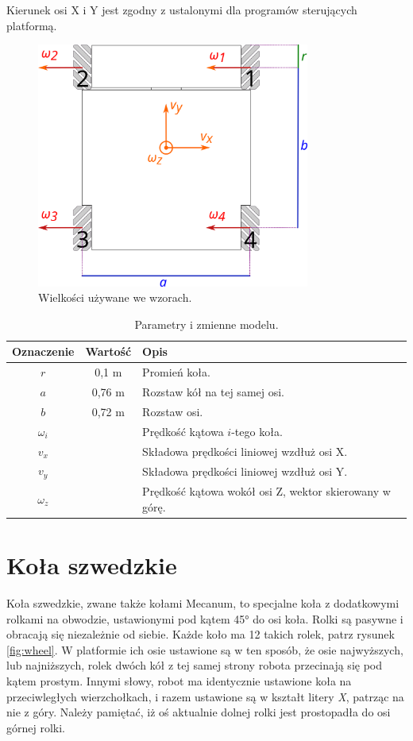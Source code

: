 	Kierunek osi X i Y jest zgodny z ustalonymi dla programów sterujących platformą.
	
	\begin{figure}[H]
		\centering
		\includegraphics[width=0.8\textwidth]{graphics/base_dims.pdf}
		\caption{Wielkości używane we wzorach.}
		\label{fig:base_dims}
	\end{figure} 

	\begin{table}
		\centering
		\begin{tabular}{c c l}
		Oznaczenie & Wartość & Opis \\
		\hline
		$r$ & 0,1 \si{\metre} & Promień koła. \\
		$a$ & 0,76 \si{\metre} & Rozstaw kół na tej samej osi. \\
		$b$ & 0,72 \si{\metre} & Rozstaw osi. \\
		$\omega_i$ & & Prędkość kątowa $i$-tego koła. \\
		$v_x$ & & Składowa prędkości liniowej wzdłuż osi X. \\
		$v_y$ & & Składowa prędkości liniowej wzdłuż osi Y. \\
		$\omega_z$ & & Prędkość kątowa wokół osi Z, wektor skierowany w górę. \\
		\end{tabular}
		\caption{Parametry i zmienne modelu.}
		\label{tab:dims}
	\end{table}
	
	

\section{Koła szwedzkie}
	Koła szwedzkie, zwane także kołami Mecanum, to specjalne koła z dodatkowymi rolkami na obwodzie, ustawionymi pod kątem \ang{45} do osi koła.
	Rolki są pasywne i obracają się niezależnie od siebie. Każde koło ma 12 takich rolek, patrz rysunek \ref{fig:wheel}.
	W platformie ich osie ustawione są w ten sposób, że osie najwyższych, lub najniższych, rolek dwóch kół z tej samej strony robota przecinają się pod kątem prostym.
	Innymi słowy, robot ma identycznie ustawione koła na przeciwległych wierzchołkach, i razem ustawione są w kształt litery \emph{X}, patrząc na nie z góry.
	Należy pamiętać, iż oś aktualnie dolnej rolki jest prostopadła do osi górnej rolki.
	
